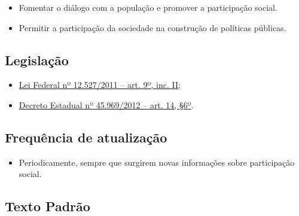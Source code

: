\documentclass[
]{book}
\providecommand{\tightlist}{%
  \setlength{\itemsep}{0pt}\setlength{\parskip}{0pt}}
\begin{document}
\begin{itemize}
\tightlist
\item
  Fomentar o diálogo com a população e promover a participação social.
\item
  Permitir a participação da sociedade na construção de políticas públicas.
\end{itemize}

\hypertarget{legislauxe7uxe3o-13}{%
\subsection{Legislação}\label{legislauxe7uxe3o-13}}

\begin{itemize}
\tightlist
\item
  \href{http://www.planalto.gov.br/ccivil_03/_ato2011-2014/2011/lei/l12527.htm\#art9}{Lei Federal nº 12.527/2011 -- art. 9º, inc. II};
\item
  \href{https://www.almg.gov.br/consulte/legislacao/completa/completa.html?tipo=DEC\&num=45969\&ano=2012}{Decreto Estadual nº 45.969/2012 -- art. 14, §6º}.
\end{itemize}

\hypertarget{frequuxeancia-de-atualizauxe7uxe3o-12}{%
\subsection{Frequência de atualização}\label{frequuxeancia-de-atualizauxe7uxe3o-12}}

\begin{itemize}
\tightlist
\item
  Periodicamente, sempre que surgirem novas informações sobre participação social.
\end{itemize}

\hypertarget{texto-padruxe3o-13}{%
\subsection{Texto Padrão}\label{texto-padruxe3o-13}}
\end{document}
